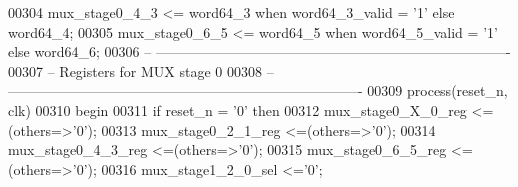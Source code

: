 \begin{DoxyCode}
00304 \textcolor{vhdlchar}{mux_stage0_4_3} \textcolor{vhdlchar}{<=} \textcolor{vhdlchar}{word64_3} \textcolor{keywordflow}{when} \textcolor{vhdlchar}{word64_3_valid} \textcolor{vhdlchar}{=} \textcolor{vhdlchar}{'}\textcolor{vhdllogic}{}\textcolor{vhdllogic}{1}\textcolor{vhdlchar}{'} \textcolor{keywordflow}{else} \textcolor{vhdlchar}{word64_4};
00305 \textcolor{vhdlchar}{mux_stage0_6_5} \textcolor{vhdlchar}{<=} \textcolor{vhdlchar}{word64_5} \textcolor{keywordflow}{when} \textcolor{vhdlchar}{word64_5_valid} \textcolor{vhdlchar}{=} \textcolor{vhdlchar}{'}\textcolor{vhdllogic}{}\textcolor{vhdllogic}{1}\textcolor{vhdlchar}{'} \textcolor{keywordflow}{else} \textcolor{vhdlchar}{word64_6};
00306 \textcolor{keyword}{-- ----------------------------------------------------------------------------}
00307 \textcolor{keyword}{-- Registers for MUX stage 0}
00308 \textcolor{keyword}{-- ---------------------------------------------------------------------------- }
00309 \textcolor{keywordflow}{process}(reset_n, clk)
00310 \textcolor{vhdlkeyword}{begin}
00311    \textcolor{keywordflow}{if} \textcolor{vhdlchar}{reset_n} \textcolor{vhdlchar}{=} \textcolor{vhdlchar}{'}\textcolor{vhdllogic}{}\textcolor{vhdllogic}{0}\textcolor{vhdlchar}{'} \textcolor{keywordflow}{then}
00312       \textcolor{vhdlchar}{mux_stage0_X_0_reg}   \textcolor{vhdlchar}{<=}\textcolor{vhdlchar}{(}\textcolor{keywordflow}{others}\textcolor{vhdlchar}{=}\textcolor{vhdlchar}{>}\textcolor{vhdlchar}{'}\textcolor{vhdllogic}{}\textcolor{vhdllogic}{0}\textcolor{vhdlchar}{'}\textcolor{vhdlchar}{)};
00313       \textcolor{vhdlchar}{mux_stage0_2_1_reg}   \textcolor{vhdlchar}{<=}\textcolor{vhdlchar}{(}\textcolor{keywordflow}{others}\textcolor{vhdlchar}{=}\textcolor{vhdlchar}{>}\textcolor{vhdlchar}{'}\textcolor{vhdllogic}{}\textcolor{vhdllogic}{0}\textcolor{vhdlchar}{'}\textcolor{vhdlchar}{)};
00314       \textcolor{vhdlchar}{mux_stage0_4_3_reg}   \textcolor{vhdlchar}{<=}\textcolor{vhdlchar}{(}\textcolor{keywordflow}{others}\textcolor{vhdlchar}{=}\textcolor{vhdlchar}{>}\textcolor{vhdlchar}{'}\textcolor{vhdllogic}{}\textcolor{vhdllogic}{0}\textcolor{vhdlchar}{'}\textcolor{vhdlchar}{)};
00315       \textcolor{vhdlchar}{mux_stage0_6_5_reg}   \textcolor{vhdlchar}{<=}\textcolor{vhdlchar}{(}\textcolor{keywordflow}{others}\textcolor{vhdlchar}{=}\textcolor{vhdlchar}{>}\textcolor{vhdlchar}{'}\textcolor{vhdllogic}{}\textcolor{vhdllogic}{0}\textcolor{vhdlchar}{'}\textcolor{vhdlchar}{)};
00316       \textcolor{vhdlchar}{mux_stage1_2_0_sel}   \textcolor{vhdlchar}{<=}\textcolor{vhdlchar}{'}\textcolor{vhdllogic}{}\textcolor{vhdllogic}{0}\textcolor{vhdlchar}{'};

\end{DoxyCode}
